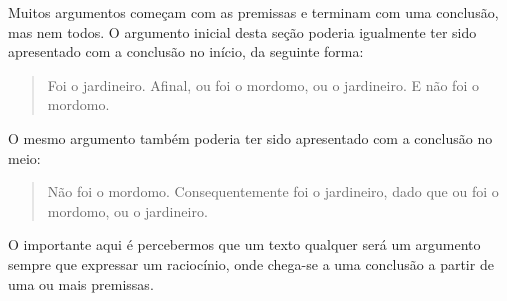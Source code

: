 Muitos argumentos começam com as premissas e terminam com uma conclusão, mas nem todos.
O argumento inicial desta seção poderia igualmente ter sido apresentado com a conclusão no início, da seguinte forma:
	\begin{quote}
		Foi o jardineiro. Afinal, ou foi o mordomo, ou o jardineiro. E não foi o mordomo.
	\end{quote}
O mesmo argumento também poderia ter sido apresentado com a conclusão no meio:
	\begin{quote}
		Não foi o mordomo. Consequentemente foi o jardineiro, dado que ou foi o mordomo, ou o jardineiro.
	\end{quote}
O importante aqui é percebermos que um texto qualquer será um argumento sempre que expressar um raciocínio, onde chega-se a uma conclusão a partir de uma ou mais premissas. 

